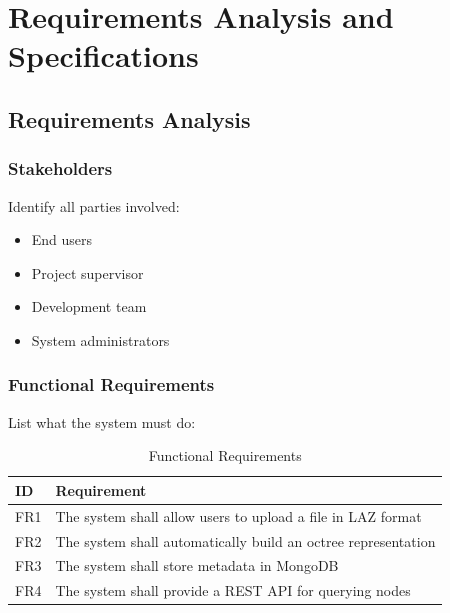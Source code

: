 \documentclass[12pt,a4paper,onecolumn,oneside]{report}
\begin{document}

\chapter{Requirements Analysis and Specifications}
\label{chap:requirements}

\section{Requirements Analysis}
\label{sec:req:analysis}

\subsection{Stakeholders}
\label{sec:req:stakeholders}

Identify all parties involved:
\begin{itemize}
    \item End users
    \item Project supervisor
    \item Development team
    \item System administrators
\end{itemize}

\subsection{Functional Requirements}
\label{sec:req:functional}

List what the system must do:

\begin{table}[h]
    \centering
    \caption{Functional Requirements}
    \label{tab:fr}
    \begin{tabular}{|l|p{8cm}|}
        \hline
        \textbf{ID} & \textbf{Requirement} \\
        \hline
        FR1 & The system shall allow users to upload a file in LAZ format \\
        \hline
        FR2 & The system shall automatically build an octree representation \\
        \hline
        FR3 & The system shall store metadata in MongoDB \\
        \hline
        FR4 & The system shall provide a REST API for querying nodes \\
        \hline
    \end{tabular}
\end{table}
\end{document}
